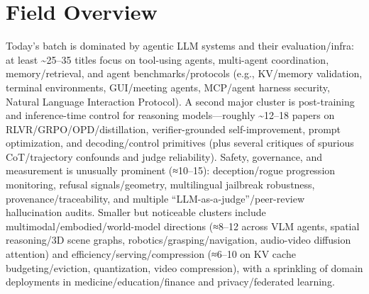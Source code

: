 \documentclass[12pt,letterpaper]{article}
\begin{document}
\medskip



\section*{Field Overview}
{\footnotesize Today's batch is dominated by agentic LLM systems and their evaluation/infra: at least \textasciitilde{}25--35 titles focus on tool-using agents, multi-agent coordination, memory/retrieval, and agent benchmarks/protocols (e.g., KV/memory validation, terminal environments, GUI/meeting agents, MCP/agent harness security, Natural Language Interaction Protocol). A second major cluster is post-training and inference-time control for reasoning models---roughly \textasciitilde{}12--18 papers on RLVR/GRPO/OPD/distillation, verifier-grounded self-improvement, prompt optimization, and decoding/control primitives (plus several critiques of spurious CoT/trajectory confounds and judge reliability). Safety, governance, and measurement is unusually prominent (≈10--15): deception/rogue progression monitoring, refusal signals/geometry, multilingual jailbreak robustness, provenance/traceability, and multiple ``LLM-as-a-judge''/peer-review hallucination audits. Smaller but noticeable clusters include multimodal/embodied/world-model directions (≈8--12 across VLM agents, spatial reasoning/3D scene graphs, robotics/grasping/navigation, audio-video diffusion attention) and efficiency/serving/compression (≈6--10 on KV cache budgeting/eviction, quantization, video compression), with a sprinkling of domain deployments in medicine/education/finance and privacy/federated learning.}
\end{document}
